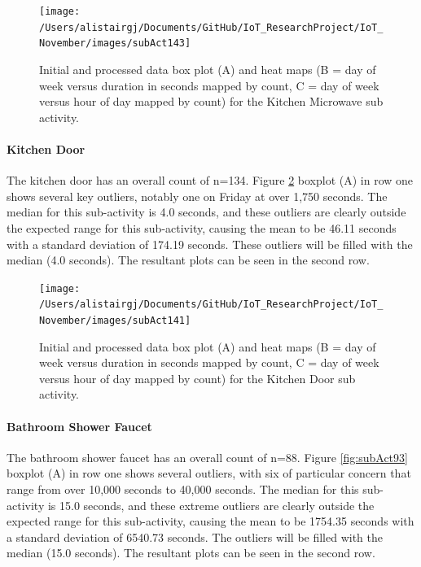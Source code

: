 \documentclass[11pt,]{article}
\let\oldparagraph\paragraph
\renewcommand{\paragraph}[1]{\oldparagraph{#1}\mbox{}}
\begin{document}
\begin{figure}[H]

{\centering \texttt{[image: /Users/alistairgj/Documents/GitHub/IoT\_ResearchProject/IoT\_November/images/subAct143]} 

}

\caption{Initial and processed data box plot (A) and heat maps (B = day of week versus duration in seconds mapped by count, C = day of week versus hour of day mapped by count) for the Kitchen Microwave sub activity.}\label{fig:subAct143}
\end{figure}

\hypertarget{kitchen-door}{%
\paragraph{Kitchen Door}\label{kitchen-door}}

The kitchen door has an overall count of n=134. Figure
\ref{fig:subAct141} boxplot (A) in row one shows several key outliers,
notably one on Friday at over 1,750 seconds. The median for this
sub-activity is 4.0 seconds, and these outliers are clearly outside the
expected range for this sub-activity, causing the mean to be 46.11
seconds with a standard deviation of 174.19 seconds. These outliers will
be filled with the median (4.0 seconds). The resultant plots can be seen
in the second row.

\begin{figure}[H]

{\centering \texttt{[image: /Users/alistairgj/Documents/GitHub/IoT\_ResearchProject/IoT\_November/images/subAct141]} 

}

\caption{Initial and processed data box plot (A) and heat maps (B = day of week versus duration in seconds mapped by count, C = day of week versus hour of day mapped by count) for the Kitchen Door sub activity.}\label{fig:subAct141}
\end{figure}

\hypertarget{bathroom-shower-faucet}{%
\paragraph{Bathroom Shower Faucet}\label{bathroom-shower-faucet}}

The bathroom shower faucet has an overall count of n=88. Figure
\ref{fig:subAct93} boxplot (A) in row one shows several outliers, with
six of particular concern that range from over 10,000 seconds to 40,000
seconds. The median for this sub-activity is 15.0 seconds, and these
extreme outliers are clearly outside the expected range for this
sub-activity, causing the mean to be 1754.35 seconds with a standard
deviation of 6540.73 seconds. The outliers will be filled with the
median (15.0 seconds). The resultant plots can be seen in the second
row.
\end{document}
